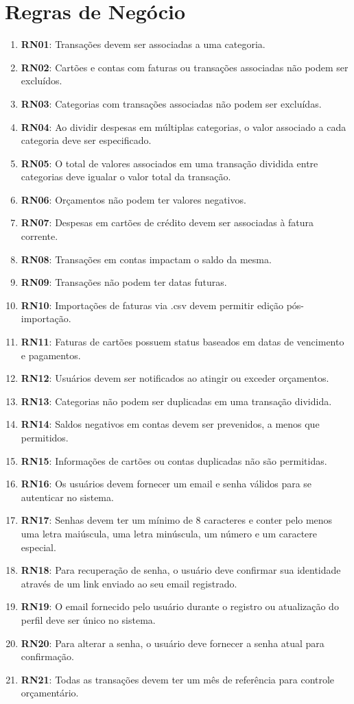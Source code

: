 \section{Regras de Negócio}
\begin{enumerate}
	\item \textbf{RN01}: Transações devem ser associadas a uma categoria.
	\item \textbf{RN02}: Cartões e contas com faturas ou transações associadas não podem ser excluídos.
	\item \textbf{RN03}: Categorias com transações associadas não podem ser excluídas.
	\item \textbf{RN04}: Ao dividir despesas em múltiplas categorias, o valor associado a cada categoria deve ser especificado.
	\item \textbf{RN05}: O total de valores associados em uma transação dividida entre categorias deve igualar o valor total da transação.
	\item \textbf{RN06}: Orçamentos não podem ter valores negativos.
	\item \textbf{RN07}: Despesas em cartões de crédito devem ser associadas à fatura corrente.
	\item \textbf{RN08}: Transações em contas impactam o saldo da mesma.
	\item \textbf{RN09}: Transações não podem ter datas futuras.
	\item \textbf{RN10}: Importações de faturas via .csv devem permitir edição pós-importação.
	\item \textbf{RN11}: Faturas de cartões possuem status baseados em datas de vencimento e pagamentos.
	\item \textbf{RN12}: Usuários devem ser notificados ao atingir ou exceder orçamentos.
	\item \textbf{RN13}: Categorias não podem ser duplicadas em uma transação dividida.
	\item \textbf{RN14}: Saldos negativos em contas devem ser prevenidos, a menos que permitidos.
	\item \textbf{RN15}: Informações de cartões ou contas duplicadas não são permitidas.
	\item \textbf{RN16}: Os usuários devem fornecer um email e senha válidos para se autenticar no sistema.
	\item \textbf{RN17}: Senhas devem ter um mínimo de 8 caracteres e conter pelo menos uma letra maiúscula, uma letra minúscula, um número e um caractere especial.
	\item \textbf{RN18}: Para recuperação de senha, o usuário deve confirmar sua identidade através de um link enviado ao seu email registrado.
	\item \textbf{RN19}: O email fornecido pelo usuário durante o registro ou atualização do perfil deve ser único no sistema.
	\item \textbf{RN20}: Para alterar a senha, o usuário deve fornecer a senha atual para confirmação.
	\item \textbf{RN21}: Todas as transações devem ter um mês de referência para controle orçamentário.
\end{enumerate}

